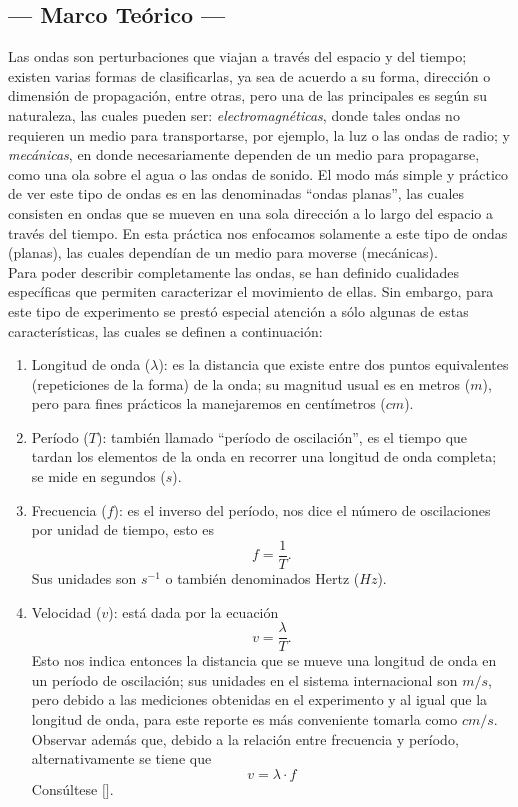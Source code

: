 \documentclass[12pt,a4paper]{article}
\begin{document}
\subsection{--- Marco Teórico ---} %
Las ondas son perturbaciones que viajan a través del espacio y del tiempo; existen varias formas de clasificarlas, ya sea de acuerdo a su forma, dirección o dimensión de propagación, entre otras, pero una de las principales es según su naturaleza, las cuales pueden ser: \textit{electromagnéticas}, donde tales ondas no requieren un medio para transportarse, por ejemplo, la luz o las ondas de radio; y \textit{mecánicas}, en donde necesariamente dependen de un medio para propagarse, como una ola sobre el agua o las ondas de sonido. El modo más simple y práctico de ver este tipo de ondas es en las denominadas “ondas planas”, las cuales consisten en ondas que se mueven en una sola dirección a lo largo del espacio a través del tiempo. En esta práctica nos enfocamos solamente a este tipo de ondas (planas), las cuales dependían de un medio para moverse (mecánicas). \\[2mm]
Para poder describir completamente las ondas, se han definido cualidades específicas que permiten caracterizar el movimiento de ellas. Sin embargo, para este tipo de experimento se prestó especial atención a sólo algunas de estas características, las cuales se definen a continuación:
\begin{enumerate}
	\item Longitud de onda (\(\lambda\)): es la distancia que existe entre dos puntos equivalentes (repeticiones de la forma) de la onda; su magnitud usual es en metros (\(m\)), pero para fines prácticos la manejaremos en centímetros (\(cm\)).
	\item Período (\(T\)): también llamado “período de oscilación”, es el tiempo que tardan los elementos de la onda en recorrer una longitud de onda completa; se mide en segundos (\(s\)).
	\item Frecuencia (\(f\)): es el inverso del período, nos dice el número de oscilaciones por unidad de tiempo, esto es
		\begin{equation}
			f = \dfrac{1}{T}.
			\label{eq:frecuencia}
		\end{equation}
		Sus unidades son \(s^{-1}\) o también denominados Hertz (\(Hz\)).
	\item Velocidad (\(v\)): está dada por la ecuación
		\begin{equation}
			v = \dfrac{\lambda}{T}.
			\label{velocidad_2}
		\end{equation}
		Esto nos indica entonces la distancia que se mueve una longitud de onda en un período de oscilación; sus unidades en el sistema internacional son \(m/s\), pero debido a las mediciones obtenidas en el experimento y al igual que la longitud de onda, para este reporte es más conveniente tomarla como \(cm/s\). Observar además que, debido a la relación entre frecuencia y período, alternativamente se tiene que
		\begin{equation}
			v = \lambda \cdot f
			\label{velocidad}
		\end{equation}
		Consúltese \([\)\cite{fisica_1,resnick}\(]\).
\end{enumerate}
\end{document}
